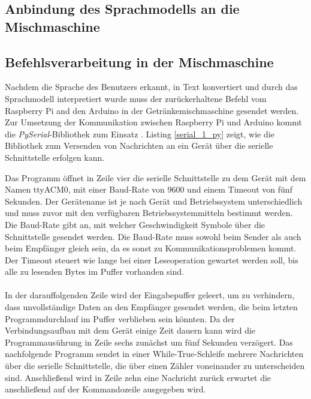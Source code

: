 \subsection{Anbindung des Sprachmodells an die Mischmaschine}
\subsection{Befehlsverarbeitung in der Mischmaschine}\label{section:Befehlsverarbeitung}
Nachdem die Sprache des Benutzers erkannt, in Text konvertiert und durch das Sprachmodell interpretiert wurde muss der zurückerhaltene Befehl vom Raspberry Pi and den Arduino in der Getränkemischmaschine gesendet werden. Zur Umsetzung der Kommunikation zwischen Raspberry Pi und Arduino kommt die \textit{PySerial}-Bibliothek zum Einsatz \cite{pyserial}. Listing \ref{serial_1_py} zeigt, wie die Bibliothek zum Versenden von Nachrichten an ein Gerät über die serielle Schnittstelle erfolgen kann.

Das Programm öffnet in Zeile vier die serielle Schnittstelle zu dem Gerät mit dem Namen \glqq{}ttyACM0\grqq{}, mit einer Baud-Rate von 9600 und einem Timeout von fünf Sekunden. Der Gerätename ist je nach Gerät und Betriebssystem unterschiedlich und muss zuvor mit den verfügbaren Betriebssystemmitteln bestimmt werden. Die Baud-Rate gibt an, mit welcher Geschwindigkeit Symbole über die Schnittstelle gesendet werden. Die Baud-Rate muss sowohl beim Sender als auch beim Empfänger gleich sein, da es sonst zu Kommunikationsproblemen kommt. Der Timeout steuert wie lange bei einer Leseoperation gewartet werden soll, bis alle zu lesenden Bytes im Puffer vorhanden sind.\\\\
In der darauffolgenden Zeile wird der Eingabepuffer geleert, um zu verhindern, dass unvollständige Daten an den Empfänger gesendet werden, die beim letzten Programmdurchlauf im Puffer verblieben sein könnten. Da der Verbindungsaufbau mit dem Gerät einige Zeit dauern kann wird die Programmausührung in Zeile sechs zunächst um fünf Sekunden verzögert. Das nachfolgende Programm sendet in einer While-True-Schleife mehrere Nachrichten über die serielle Schnittstelle, die über einen Zähler voneinander zu unterscheiden sind. Anschließend wird in Zeile zehn eine Nachricht zurück erwartet die anschließend auf der Kommandozeile ausgegeben wird.\\\\
